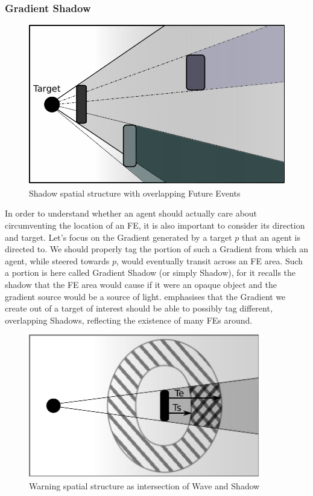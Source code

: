 \documentclass[12pt,a4paper,twoside,openright]{book}
\begin{document}
\subsubsection{Gradient Shadow}
\begin{figure}
	\begin{center}
		\includegraphics[width=\textwidth]{img/shadow}
\end{center}
\caption{Shadow spatial structure with overlapping Future Events}
\label{fig:shadow} 
\end{figure}

In order to understand whether an agent should actually care about circumventing the location of an FE, it is also important to consider its direction and target.
%
Let's focus on the Gradient generated by a target $p$ that an agent is directed to.
%
We should properly tag the portion of such a Gradient from which an agent, while steered towards $p$, would eventually transit across an FE area.
%
Such a portion is here called Gradient Shadow (or simply Shadow), for it recalls the shadow that the FE area would cause if it were an opaque object and the gradient source would be a source of light.
%
 emphasises that the Gradient we create out of a target of interest should be able to possibly tag different, overlapping Shadows, reflecting the existence of many FEs around.

\begin{figure}
	\begin{center}
		\includegraphics[width=0.9\textwidth]{img/warning-rettangolare}
\end{center}
\caption{Warning spatial structure as intersection of Wave and Shadow}
\label{fig:warning} 
\end{figure}
\end{document}
